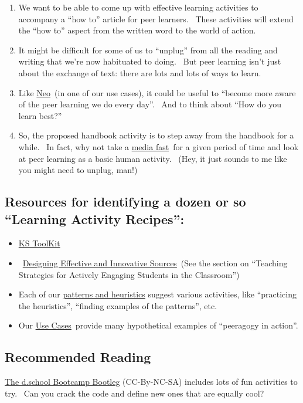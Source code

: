 \begin{enumerate}
\item
  We want to be able to come up with effective learning activities to
  accompany a ``how to'' article for peer learners. ~These activities
  will extend the ``how to'' aspect from the written word to the world
  of action.
\item
  It might be difficult for some of us to ``unplug'' from all the
  reading and writing that we're now habituated to doing. ~But peer
  learning isn't just about the exchange of text: there are lots and
  lots of ways to learn.
\item
  Like
  \href{http://peeragogy.org/use-cases/paeragogy-helps-solve-complex-problems/}{Neo}~(in
  one of our use cases), it could be useful to ``become more aware of
  the peer learning we do every day''.~ And to think about ``How do you
  learn best?''
\item
  So, the proposed handbook activity is to step away from the handbook
  for a while. ~In fact, why not take a
  \href{http://zenhabits.net/edit-your-life-part-6-a-media-fast/}{media
  fast}~for a given period of time and look at peer learning as a basic
  human activity.~ (Hey, it just sounds to me like you might need to
  unplug, man!)
\end{enumerate}

\subsection{Resources for identifying a dozen or so ``Learning Activity
Recipes'':}

\begin{itemize}
\item
  \href{http://www.kstoolkit.org/KS+Methods}{KS ToolKit}
\item
  ~\href{http://serc.carleton.edu/NAGTWorkshops/coursedesign/tutorial/strategies.html}{Designing
  Effective and Innovative Sources}~(See the section on ``Teaching
  Strategies for Actively Engaging Students in the Classroom'')
\item
  Each of our
  \href{http://peeragogy.org/patterns-and-heuristics/}{patterns and
  heuristics} suggest various activities, like ``practicing the
  heuristics'', ``finding examples of the patterns'', etc.
\item
  Our \href{http://peeragogy.org/use-cases}{Use Cases}~provide many
  hypothetical examples of ``peeragogy in action''.
\end{itemize}

\subsection{Recommended Reading}

\href{http://dschool.stanford.edu/wp-content/uploads/2011/03/BootcampBootleg2010v2SLIM.pdf}{The
d.school Bootcamp Bootleg} (CC-By-NC-SA) includes lots of fun activities
to try. ~Can you crack the code and define new ones that are equally
cool?
